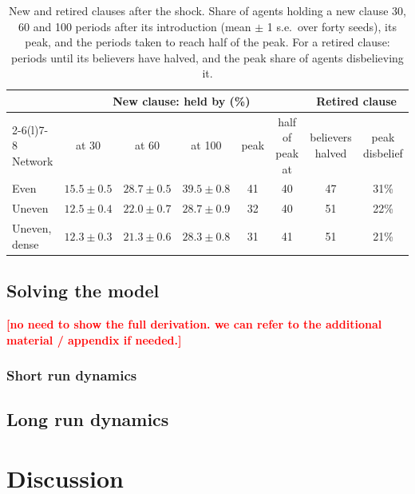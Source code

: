 \documentclass[11pt]{article}
\newcommand{\todo}[1]{\textcolor{red}{\textbf{[#1]}}}
\begin{document}
\begin{table}[H]
\centering
\caption{New and retired clauses after the shock. Share of agents holding a new clause 30, 60 and 100 periods after its introduction (mean $\pm$ 1 s.e.\ over forty seeds), its peak, and the periods taken to reach half of the peak. For a retired clause: periods until its believers have halved, and the peak share of agents disbelieving it.}
\label{tab:clauses}
\footnotesize
\begin{tabular}{@{}lccccccc@{}}
\toprule
 & \multicolumn{5}{c}{New clause: held by (\%)} & \multicolumn{2}{c}{Retired clause} \\
\cmidrule(lr){2-6}\cmidrule(l){7-8}
Network & at 30 & at 60 & at 100 & peak & half of peak at & believers halved & peak disbelief \\
\midrule
Even          & $15.5 \pm 0.5$ & $28.7 \pm 0.5$ & $39.5 \pm 0.8$ & 41 & 40 & 47 & 31\% \\
Uneven        & $12.5 \pm 0.4$ & $22.0 \pm 0.7$ & $28.7 \pm 0.9$ & 32 & 40 & 51 & 22\% \\
Uneven, dense & $12.3 \pm 0.3$ & $21.3 \pm 0.6$ & $28.3 \pm 0.8$ & 31 & 41 & 51 & 21\% \\
\bottomrule
\end{tabular}
\end{table}

\subsection{Solving the model}\label{sec:shortrun}

\todo{no need to show the full derivation. we can refer to the additional material / appendix if needed.}

\subsubsection{Short run dynamics}

\subsection{Long run dynamics}\label{sec:longrun}



\section{Discussion}\label{sec:discussion}
\end{document}
